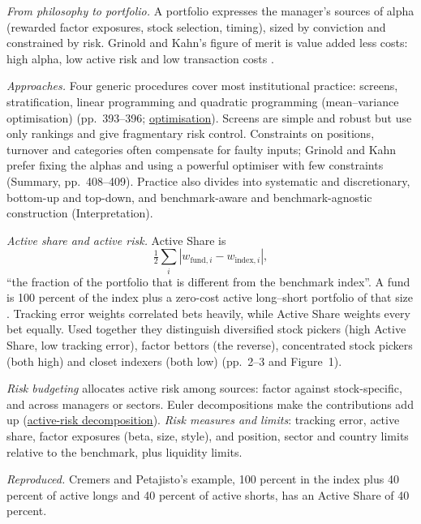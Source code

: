 \begin{qfmethod}\label{meth:active-equity-portfolio-construction}
 \emph{From philosophy to portfolio.} A portfolio expresses the manager's sources of alpha (rewarded factor exposures, stock selection, timing), sized by conviction and constrained by risk. Grinold and Kahn's figure of merit is value added less costs: high alpha, low active risk and low transaction costs \citep[chap.~14, p.~393]{alpha-grinold}.

\emph{Approaches.} Four generic procedures cover most institutional practice: screens, stratification, linear programming and quadratic programming (mean--variance optimisation) (pp.~393--396; \hyperref[mod:mean-variance-portfolio-optimisation]{optimisation}). Screens are simple and robust but use only rankings and give fragmentary risk control. Constraints on positions, turnover and categories often compensate for faulty inputs; Grinold and Kahn prefer fixing the alphas and using a powerful optimiser with few constraints (Summary, pp.~408--409). Practice also divides into systematic and discretionary, bottom-up and top-down, and benchmark-aware and benchmark-agnostic construction (Interpretation).

\emph{Active share and active risk.} Active Share is
\[ \tfrac12\sum_i|w_{\text{fund},i}-w_{\text{index},i}|, \]
``the fraction of the portfolio that is different from the benchmark index''. A fund is 100 percent of the index plus a zero-cost active long--short portfolio of that size \citep[sec.~2.2]{cremers-petajisto-2009}. Tracking error weights correlated bets heavily, while Active Share weights every bet equally. Used together they distinguish diversified stock pickers (high Active Share, low tracking error), factor bettors (the reverse), concentrated stock pickers (both high) and closet indexers (both low) (pp.~2--3 and Figure~1).

\emph{Risk budgeting} allocates active risk among sources: factor against stock-specific, and across managers or sectors. Euler decompositions make the contributions add up (\hyperref[meth:active-risk-decomposition]{active-risk decomposition}). \emph{Risk measures and limits}: tracking error, active share, factor exposures (beta, size, style), and position, sector and country limits relative to the benchmark, plus liquidity limits.

 \emph{Reproduced.} Cremers and Petajisto's example, 100 percent in the index plus 40 percent of active longs and 40 percent of active shorts, has an Active Share of 40 percent.


\end{qfmethod}
